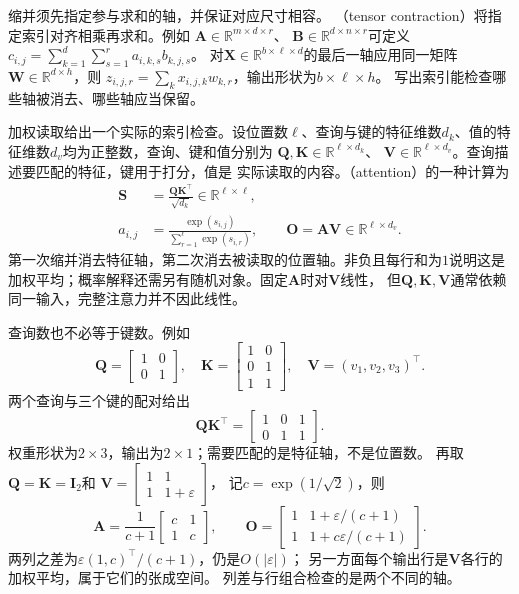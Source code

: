 缩并须先指定参与求和的轴，并保证对应尺寸相容。
（tensor contraction）将指定索引对齐相乘再求和。例如
$\bm A\in\mathbb R^{m\times d\times r}$、
$\bm B\in\mathbb R^{d\times n\times r}$可定义
$c_{i,j}=\sum_{k=1}^d\sum_{s=1}^r a_{i,k,s}b_{k,j,s}$。
对$\bm X\in\mathbb R^{b\times\ell\times d}$的最后一轴应用同一矩阵
$\bm W\in\mathbb R^{d\times h}$，则
$z_{i,j,r}=\sum_k x_{i,j,k}w_{k,r}$，输出形状为$b\times\ell\times h$。
写出索引能检查哪些轴被消去、哪些轴应当保留。


加权读取给出一个实际的索引检查。设位置数$\ell$、查询与键的特征维数$d_k$、值的特征维数$d_v$均为正整数，查询、键和值分别为
$\bm Q,\bm K\in\mathbb R^{\ell\times d_k}$、
$\bm V\in\mathbb R^{\ell\times d_v}$。查询描述要匹配的特征，键用于打分，值是
实际读取的内容。（attention）的一种计算为
\begin{align}
 \bm S&=\frac{\bm Q\bm K^\top}{\sqrt{d_k}}\in\mathbb R^{\ell\times\ell},
 \label{eq:linear-algebra-attention-scores}\\
 a_{i,j}&=\frac{\exp(s_{i,j})}{\sum_{r=1}^{\ell}\exp(s_{i,r})},
 \qquad\bm O=\bm A\bm V\in\mathbb R^{\ell\times d_v}.
 \label{eq:linear-algebra-attention-contraction}
\end{align}
第一次缩并消去特征轴，第二次消去被读取的位置轴。非负且每行和为$1$说明这是
加权平均；概率解释还需另有随机对象。固定$\bm A$时对$\bm V$线性，
但$\bm Q,\bm K,\bm V$通常依赖同一输入，完整注意力并不因此线性。

查询数也不必等于键数。例如
\[
 \bm Q=\begin{bmatrix}1&0\\0&1\end{bmatrix},\quad
 \bm K=\begin{bmatrix}1&0\\0&1\\1&1\end{bmatrix},\quad
 \bm V=(v_1,v_2,v_3)^\top.
\]
两个查询与三个键的配对给出
\[
 \bm Q\bm K^\top=\begin{bmatrix}1&0&1\\0&1&1\end{bmatrix}.
\]
权重形状为$2\times3$，输出为$2\times1$；需要匹配的是特征轴，不是位置数。
再取$\bm Q=\bm K=\bm I_2$和
$\bm V=\left[\begin{smallmatrix}1&1\\1&1+\varepsilon\end{smallmatrix}\right]$，
记$c=\exp(1/\sqrt2)$，则
\[
 \bm A=\frac1{c+1}\begin{bmatrix}c&1\\1&c\end{bmatrix},\qquad
 \bm O=\begin{bmatrix}
 1&1+\varepsilon/(c+1)\\1&1+c\varepsilon/(c+1)
 \end{bmatrix}.
\]
两列之差为$\varepsilon(1,c)^\top/(c+1)$，仍是$O(|\varepsilon|)$；
另一方面每个输出行是$\bm V$各行的加权平均，属于它们的张成空间。
列差与行组合检查的是两个不同的轴。

